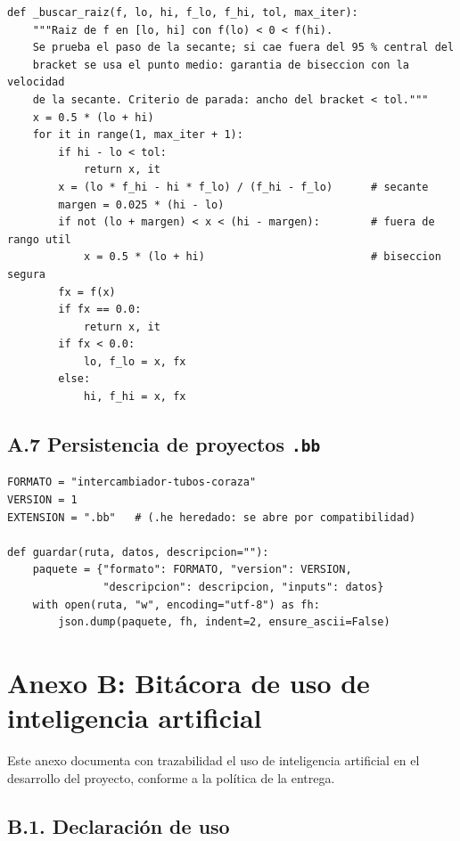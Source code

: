 \documentclass[11pt,a4paper]{article}
\begin{document}
\begin{verbatim}
def _buscar_raiz(f, lo, hi, f_lo, f_hi, tol, max_iter):
    """Raiz de f en [lo, hi] con f(lo) < 0 < f(hi).
    Se prueba el paso de la secante; si cae fuera del 95 % central del
    bracket se usa el punto medio: garantia de biseccion con la velocidad
    de la secante. Criterio de parada: ancho del bracket < tol."""
    x = 0.5 * (lo + hi)
    for it in range(1, max_iter + 1):
        if hi - lo < tol:
            return x, it
        x = (lo * f_hi - hi * f_lo) / (f_hi - f_lo)      # secante
        margen = 0.025 * (hi - lo)
        if not (lo + margen) < x < (hi - margen):        # fuera de rango util
            x = 0.5 * (lo + hi)                          # biseccion segura
        fx = f(x)
        if fx == 0.0:
            return x, it
        if fx < 0.0:
            lo, f_lo = x, fx
        else:
            hi, f_hi = x, fx
\end{verbatim}

\subsection*{A.7 Persistencia de proyectos \texttt{.bb}}

\begin{verbatim}
FORMATO = "intercambiador-tubos-coraza"
VERSION = 1
EXTENSION = ".bb"   # (.he heredado: se abre por compatibilidad)

def guardar(ruta, datos, descripcion=""):
    paquete = {"formato": FORMATO, "version": VERSION,
               "descripcion": descripcion, "inputs": datos}
    with open(ruta, "w", encoding="utf-8") as fh:
        json.dump(paquete, fh, indent=2, ensure_ascii=False)
\end{verbatim}




\section*{Anexo B: Bit\'acora de uso de inteligencia artificial}

Este anexo documenta con trazabilidad el uso de inteligencia artificial en
el desarrollo del proyecto, conforme a la pol\'itica de la entrega.

\subsection*{B.1. Declaraci\'on de uso}
\end{document}
